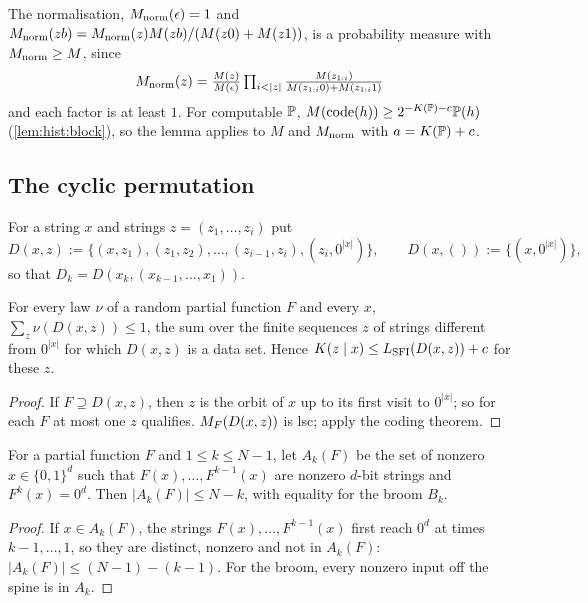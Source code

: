The normalisation, $M_{\mathrm{norm}}(\epsilon)=1$ and $M_{\mathrm{norm}}(zb)=M_{\mathrm{norm}}(z)M(zb)/(M(z0)+M(z1))$, is a probability measure with $M_{\mathrm{norm}}\ge M$, since
\[\textstyle\Mnorm(z)=\frac{M(z)}{M(\epsilon)}\prod_{i<|z|}\frac{M(z_{1:i})}{M(z_{1:i}0)+M(z_{1:i}1)}\]
and each factor is at least $1$. For computable $\mathbb{P}$, $M(\operatorname{code}(h))\ge2^{-K(\mathbb{P})-c}\mathbb{P}(h)$ (\cref{lem:hist:block}), so the lemma applies to $M$ and $M_{\mathrm{norm}}$ with $a=K(\mathbb{P})+c$.

\subsection{The cyclic permutation}\label{app:ex:cyclic}

For a string $x$ and strings $z=(z_1,\dots,z_i)$ put
\[D(x,z):=\{(x,z_1),(z_1,z_2),\dots,(z_{i-1},z_i),(z_i,0^{|x|})\},\qquad D(x,()):=\{(x,0^{|x|})\},\]
so that $D_k=D(x_k,(x_{k-1},\dots,x_1))$.

\begin{lemma}\label{lem:ex:chainsemi}
For every law $\nu$ of a random partial function $F$ and every $x$, $\sum_z\nu(D(x,z))\le1$, the sum over the finite sequences $z$ of strings different from $0^{|x|}$ for which $D(x,z)$ is a data set. Hence $K(z\mid x)\le L_{\mathrm{SFI}}(D(x,z))+c$ for these $z$.
\end{lemma}

\begin{proof}
If $F\supseteq D(x,z)$, then $z$ is the orbit of $x$ up to its first visit to $0^{|x|}$; so for each $F$ at most one $z$ qualifies. $M_{F}(D(x,z))$ is lsc; apply the coding theorem.
\end{proof}

\begin{lemma}\label{lem:ex:depth}
For a partial function $F$ and $1\le k\le N-1$, let $A_k(F)$ be the set of nonzero $x\in\{0,1\}^d$ such that $F(x),\dots,F^{k-1}(x)$ are nonzero $d$-bit strings and $F^k(x)=0^d$. Then $|A_k(F)|\le N-k$, with equality for the broom $B_k$.
\end{lemma}

\begin{proof}
If $x\in A_k(F)$, the strings $F(x),\dots,F^{k-1}(x)$ first reach $0^d$ at times $k-1,\dots,1$, so they are distinct, nonzero and not in $A_k(F)$: $|A_k(F)|\le(N-1)-(k-1)$. For the broom, every nonzero input off the spine is in $A_k$.
\end{proof}

